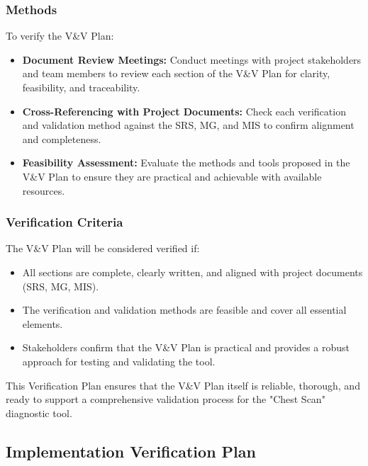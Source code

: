 \documentclass[12pt, titlepage]{article}
\begin{document}
\subsubsection{Methods}
To verify the V\&V Plan:
\begin{itemize}
  \item \textbf{Document Review Meetings:} Conduct meetings with project stakeholders and team members to review each section of the V\&V Plan for clarity, feasibility, and traceability.
  \item \textbf{Cross-Referencing with Project Documents:} Check each verification and validation method against the SRS, MG, and MIS to confirm alignment and completeness.
  \item \textbf{Feasibility Assessment:} Evaluate the methods and tools proposed in the V\&V Plan to ensure they are practical and achievable with available resources.
\end{itemize}

\subsubsection{Verification Criteria}
The V\&V Plan will be considered verified if:
\begin{itemize}
  \item All sections are complete, clearly written, and aligned with project documents (SRS, MG, MIS).
  \item The verification and validation methods are feasible and cover all essential elements.
  \item Stakeholders confirm that the V\&V Plan is practical and provides a robust approach for testing and validating the tool.
\end{itemize}

This Verification Plan ensures that the V\&V Plan itself is reliable, thorough, and ready to support a comprehensive validation process for the "Chest Scan" diagnostic tool.


\subsection{Implementation Verification Plan}

\end{document}

